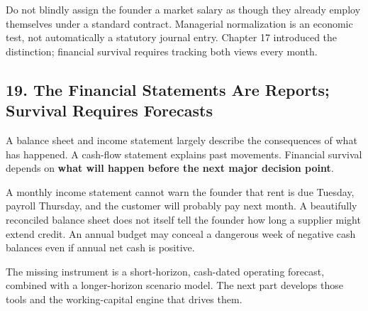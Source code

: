Do not blindly assign the founder a market salary as though they already employ themselves under a standard contract. Managerial normalization is an economic test, not automatically a statutory journal entry. Chapter 17 introduced the distinction; financial survival requires tracking both views every month.

\subsection*{19. The Financial Statements Are Reports; Survival Requires Forecasts}

A balance sheet and income statement largely describe the consequences of what has happened. A cash-flow statement explains past movements. Financial survival depends on \textbf{what will happen before the next major decision point}.

A monthly income statement cannot warn the founder that rent is due Tuesday, payroll Thursday, and the customer will probably pay next month. A beautifully reconciled balance sheet does not itself tell the founder how long a supplier might extend credit. An annual budget may conceal a dangerous week of negative cash balances even if annual net cash is positive.

The missing instrument is a short-horizon, cash-dated operating forecast, combined with a longer-horizon scenario model. The next part develops those tools and the working-capital engine that drives them.
